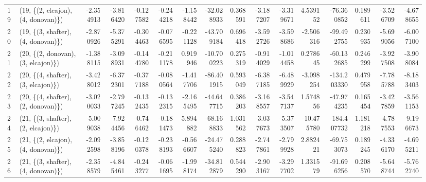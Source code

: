 \begin{tabular}{llrrrrrrrrrrrrrr}
19 &  (19, \{(2, elcajon), (4, donovan)\}) &  -2.354913 &  -3.816420 &  -0.127582 & -0.244218 &  -1.158442 &   -32.028933 &   0.368591 &  -3.187207 &  -3.319671 &   4.539152 &  -76.360852 &  0.189611 &  -3.526709 &  -4.678655 \\
20 &  (19, \{(3, shafter), (4, donovan)\}) &  -2.870926 &  -5.375291 &  -0.304463 & -0.076595 &  -0.221128 &   -43.709184 &   0.696418 &  -3.592726 &  -3.598686 &  -2.506316 &  -99.492755 &  0.230935 &  -5.699056 &  -6.007100 \\
21 &  (20, \{(2, donovan), (3, elcajon)\}) &  -1.388115 &  -3.098931 &  -0.144780 & -0.211178 &   0.919946 &   -10.700223 &   0.275319 &  -0.914029 &  -1.014458 &   0.278645 &  -60.132685 &  0.246299 &  -3.927508 &  -3.908084 \\
22 &  (20, \{(4, shafter), (3, elcajon)\}) &  -3.428012 &  -6.372301 &  -0.377188 & -0.080564 &  -1.417706 &   -86.401915 &   0.593049 &  -6.387185 &  -6.489929 &  -3.098254 & -134.203330 &  0.479958 &  -7.785788 &  -8.183403 \\
23 &  (20, \{(4, shafter), (2, donovan)\}) &  -3.020033 &  -2.797245 &  -0.132435 & -0.132315 &  -2.165495 &   -44.647715 &   0.386203 &  -3.168557 &  -3.547137 &   1.574856 &  -47.974235 &  0.165454 &  -3.427859 &  -3.561153 \\
24 &  (21, \{(3, shafter), (2, elcajon)\}) &  -5.009038 &  -7.924456 &  -0.746462 & -0.181473 &   5.894882 &   -68.168833 &   1.031562 &  -3.037673 &  -5.373507 & -10.475780 & -184.407732 &  1.181218 &  -4.787553 &  -9.196673 \\
25 &  (21, \{(2, elcajon), (4, donovan)\}) &  -2.092598 &  -3.858196 &  -0.120378 & -0.238193 &  -0.566607 &   -24.475240 &   0.288823 &  -2.747861 &  -2.799928 &   2.882421 &  -69.753073 &  0.189245 &  -4.336170 &  -4.695211 \\
26 &  (21, \{(3, shafter), (4, donovan)\}) &  -2.358579 &  -4.845461 &  -0.243277 & -0.061695 &  -1.998174 &   -34.812879 &   0.544290 &  -2.903167 &  -3.297702 &   1.331579 &  -91.696256 &  0.208570 &  -5.648744 &  -5.762740 \\
\bottomrule
\end{tabular}
